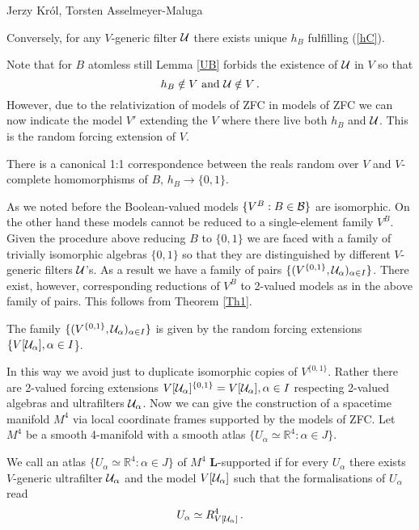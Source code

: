 \begin{artengenv2auth}{Jerzy Kr\'ol, Torsten Asselmeyer-Maluga}
\begin{Lemma}
Conversely, for any $V$-generic filter ${\cal U}$ there exists unique $h_B$ fulfilling (\ref{hC}).
\end{Lemma}
Note that for $B$ atomless still Lemma \ref{UB} forbids the existence of ${\cal U}$ in $V$ so that \[h_B\notin V \text{ and } {\cal U}\notin V\,. \] 
However, due to the relativization of models of ZFC in models of ZFC we can now indicate the model $V'$ extending the $V$ where there live both $h_B$ and ${\cal U}$. This is the random forcing extension of $V$.
\begin{Theorem}\parencite[p.36]{Solovay1970}\label{Th1}
There is a canonical 1:1 correspondence between the reals random over $V$ and $V$-complete homomorphisms of $B$, $h_B\to \{0,1\}$.
\end{Theorem}
As we noted before the Boolean-valued models $\{V^B: B\in {\cal B}\}$ are isomorphic. On the other hand these models cannot be reduced to a single-element family $V^B$. Given the procedure above reducing $B$ to $\{0,1\}$ we are faced with a family of trivially isomorphic algebras $\{0,1\}$ so that they are distinguished by different $V$-generic filters ${\cal U}$'s. As a result we have a family of pairs $\{(V^{\{0,1\}},{\cal U}_{\alpha})_{\alpha\in I}\} $. There exist, however, corresponding reductions of $V^B$ to 2-valued models as in the above family of pairs. This follows from Theorem \ref{Th1}.
\begin{Lemma}
The family $\{(V^{\{0,1\}},{\cal U}_{\alpha})_{\alpha\in I}\} $ is given by the random forcing extensions $\{ V[{\cal U}_{\alpha}], \alpha\in I$\}.  
\end{Lemma}
In this way we avoid just to duplicate isomorphic copies of $V^{\{0,1\}}$. Rather there are 2-valued forcing extensions $V[{\cal U}_{\alpha}]^{\{0,1\}}=V[{\cal U}_{\alpha}], \alpha\in I$ respecting 2-valued algebras and ultrafilters ${\cal U}_{\alpha}$.
Now we can give the construction of a spacetime manifold $M^4$ via local coordinate frames supported by the models of ZFC. Let $M^4$ be a smooth 4-manifold with a smooth atlas $\{ U_{\alpha}\simeq \mathbb{R}^4:\alpha \in J \}$.
\begin{Definition}\label{def1}
We call an atlas $\{ U_{\alpha}\simeq \mathbb{R}^4:\alpha \in J \}$ of $M^4$ {\bf L}-supported if for every $U_{\alpha}$ there exists $V$-generic ultrafilter ${\cal U}_{\alpha}$ and the model $V[{\cal U}_{\alpha}]$ such that the formalisations of $U_{\alpha}$ read
\begin{equation}\label{F} U_{\alpha}\simeq R^4_{V[{\cal U}_{\alpha}]}\,. \end{equation}

\end{Definition}
\end{artengenv2auth}
